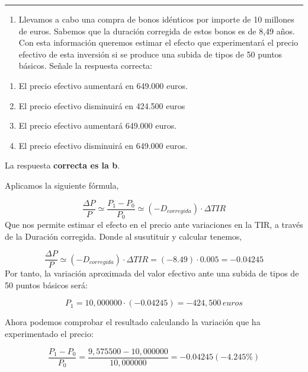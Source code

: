 \documentclass[
  letterpaper,
  DIV=11,
  numbers=noendperiod]{scrreprt}
\providecommand{\tightlist}{%
  \setlength{\itemsep}{0pt}\setlength{\parskip}{0pt}}\usepackage{longtable,booktabs,array}
\begin{document}
\begin{center}\rule{0.5\linewidth}{0.5pt}\end{center}

\begin{enumerate}
\def\labelenumi{\arabic{enumi}.}
\setcounter{enumi}{108}
\tightlist
\item
  Llevamos a cabo una compra de bonos idénticos por importe de 10
  millones de euros. Sabemos que la duración corregida de estos bonos es
  de 8,49 años. Con esta información queremos estimar el efecto que
  experimentará el precio efectivo de esta inversión si se produce una
  subida de tipos de 50 puntos básicos. Señale la respuesta correcta:
\end{enumerate}

\begin{enumerate}
\def\labelenumi{\alph{enumi})}
\item
  El precio efectivo aumentará en 649.000 euros.
\item
  El precio efectivo disminuirá en 424.500 euros
\item
  El precio efectivo aumentará 649.000 euros.
\item
  El precio efectivo disminuirá en 649.000 euros.
\end{enumerate}

\begin{tcolorbox}[enhanced jigsaw, left=2mm, opacityback=0, colback=white, breakable, arc=.35mm, bottomrule=.15mm, rightrule=.15mm, toprule=.15mm, leftrule=.75mm, colframe=quarto-callout-tip-color-frame]
\begin{minipage}[t]{5.5mm}
\textcolor{quarto-callout-tip-color}{\faLightbulb}
\end{minipage}%
\begin{minipage}[t]{\textwidth - 5.5mm}

La respuesta \textbf{correcta es la b}.

Aplicamos la siguiente fórmula,

\[\frac{\Delta P}{P}\simeq  \frac{P_1-P_0}{P_0}\simeq \left(-D_{corregida}\right)\cdot\Delta TIR\]
Que nos permite estimar el efecto en el precio ante variaciones en la
TIR, a través de la Duración corregida. Donde al susutituir y calcular
tenemos,

\[\frac{\Delta P}{P}\simeq \left(-D_{corregida}\right)\cdot\Delta TIR=(-8.49)\cdot 0.005=-0.04245\]
Por tanto, la variación aproximada del valor efectivo ante una subida de
tipos de 50 puntos básicos será:

\[P_1 = 10,000000\cdot (-0.04245) =-424,500\,euros\]

Ahora podemos comprobar el resultado calculando la variación que ha
experimentado el precio:

\[\frac{P_1-P_0}{P_0}=\frac{9,575500-10,000000}{10,000000}=-0.04245(-4.245\%)\]

\end{minipage}%
\end{tcolorbox}
\end{document}
